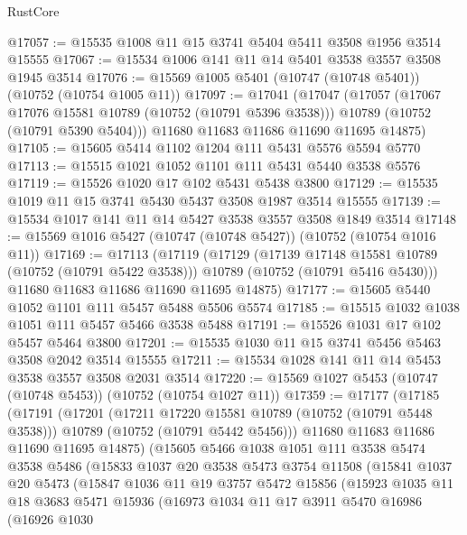 \begin{lexlean}{RustCore}
\begin{coremodule}
@17057 := @15535 @1008 @11 @15 @3741 @5404 @5411 @3508 @1956 @3514 @15555
@17067 := @15534 @1006 @141 @11 @14 @5401 @3538 @3557 @3508 @1945 @3514
@17076 := @15569 @1005 @5401 (@10747 (@10748 @5401)) (@10752 (@10754 @1005 @11))
@17097 := @17041
    (@17047
      (@17057
        (@17067 @17076 @15581 @10789 (@10752 (@10791 @5396 @3538)))
        @10789
        (@10752 (@10791 @5390 @5404)))
      @11680
      @11683
      @11686
      @11690
      @11695
      @14875)
@17105 := @15605 @5414 @1102 @1204 @111 @5431 @5576 @5594 @5770
@17113 := @15515 @1021 @1052 @1101 @111 @5431 @5440 @3538 @5576
@17119 := @15526 @1020 @17 @102 @5431 @5438 @3800
@17129 := @15535 @1019 @11 @15 @3741 @5430 @5437 @3508 @1987 @3514 @15555
@17139 := @15534 @1017 @141 @11 @14 @5427 @3538 @3557 @3508 @1849 @3514
@17148 := @15569 @1016 @5427 (@10747 (@10748 @5427)) (@10752 (@10754 @1016 @11))
@17169 := @17113
    (@17119
      (@17129
        (@17139 @17148 @15581 @10789 (@10752 (@10791 @5422 @3538)))
        @10789
        (@10752 (@10791 @5416 @5430)))
      @11680
      @11683
      @11686
      @11690
      @11695
      @14875)
@17177 := @15605 @5440 @1052 @1101 @111 @5457 @5488 @5506 @5574
@17185 := @15515 @1032 @1038 @1051 @111 @5457 @5466 @3538 @5488
@17191 := @15526 @1031 @17 @102 @5457 @5464 @3800
@17201 := @15535 @1030 @11 @15 @3741 @5456 @5463 @3508 @2042 @3514 @15555
@17211 := @15534 @1028 @141 @11 @14 @5453 @3538 @3557 @3508 @2031 @3514
@17220 := @15569 @1027 @5453 (@10747 (@10748 @5453)) (@10752 (@10754 @1027 @11))
@17359 := @17177
    (@17185
      (@17191
        (@17201
          (@17211 @17220 @15581 @10789 (@10752 (@10791 @5448 @3538)))
          @10789
          (@10752 (@10791 @5442 @5456)))
        @11680
        @11683
        @11686
        @11690
        @11695
        @14875)
      (@15605
        @5466
        @1038
        @1051
        @111
        @3538
        @5474
        @3538
        @5486
        (@15833
          @1037
          @20
          @3538
          @5473
          @3754
          @11508
          (@15841
            @1037
            @20
            @5473
            (@15847
              @1036
              @11
              @19
              @3757
              @5472
              @15856
              (@15923
                @1035
                @11
                @18
                @3683
                @5471
                @15936
                (@16973
                  @1034
                  @11
                  @17
                  @3911
                  @5470
                  @16986
                  (@16926
                    @1030

\end{coremodule}
\end{lexlean}
